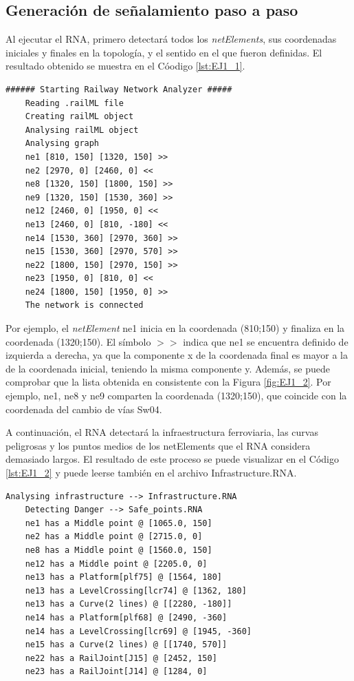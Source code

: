 \subsection{Generación de señalamiento paso a paso}

	Al ejecutar el RNA, primero detectará todos los \textit{netElements}, sus coordenadas iniciales y finales en la topología, y el sentido en el que fueron definidas. El resultado obtenido se muestra en el Cóodigo \ref{lst:EJ1_1}.
	
	\begin{lstlisting}[language = {}, caption = Detección de \textit{netElements} por parte del RNA , label = {lst:EJ1_1}]
	###### Starting Railway Network Analyzer #####
	Reading .railML file
	Creating railML object
	Analysing railML object
	Analysing graph
	ne1 [810, 150] [1320, 150] >>
	ne2 [2970, 0] [2460, 0] <<
	ne8 [1320, 150] [1800, 150] >>
	ne9 [1320, 150] [1530, 360] >>
	ne12 [2460, 0] [1950, 0] <<
	ne13 [2460, 0] [810, -180] <<
	ne14 [1530, 360] [2970, 360] >>
	ne15 [1530, 360] [2970, 570] >>
	ne22 [1800, 150] [2970, 150] >>
	ne23 [1950, 0] [810, 0] <<
	ne24 [1800, 150] [1950, 0] >>
	The network is connected
	\end{lstlisting}
	
	Por ejemplo, el \textit{netElement} ne1 inicia en la coordenada (810;150) y finaliza en la coordenada (1320;150). El símbolo $>>$ indica que ne1 se encuentra definido de izquierda a derecha, ya que la componente x de la coordenada final es mayor a la de la coordenada inicial, teniendo la misma componente y. Además, se puede comprobar que la lista obtenida en consistente con la Figura \ref{fig:EJ1_2}. Por ejemplo, ne1, ne8 y ne9 comparten la coordenada (1320;150), que coincide con la coordenada del cambio de vías Sw04.
	
	A continuación, el RNA detectará la infraestructura ferroviaria, las curvas peligrosas y los puntos medios de los netElements que el RNA considera demasiado largos. El resultado de este proceso se puede visualizar en el Código \ref{lst:EJ1_2} y puede leerse también en el archivo Infrastructure.RNA.
	
	\begin{lstlisting}[language = {}, caption = Detección de puntos críticos por parte del RNA , label = {lst:EJ1_2}]
	Analysing infrastructure --> Infrastructure.RNA
	Detecting Danger --> Safe_points.RNA
	ne1 has a Middle point @ [1065.0, 150]
	ne2 has a Middle point @ [2715.0, 0]
	ne8 has a Middle point @ [1560.0, 150]
	ne12 has a Middle point @ [2205.0, 0]
	ne13 has a Platform[plf75] @ [1564, 180]
	ne13 has a LevelCrossing[lcr74] @ [1362, 180]
	ne13 has a Curve(2 lines) @ [[2280, -180]]
	ne14 has a Platform[plf68] @ [2490, -360]
	ne14 has a LevelCrossing[lcr69] @ [1945, -360]
	ne15 has a Curve(2 lines) @ [[1740, 570]]
	ne22 has a RailJoint[J15] @ [2452, 150]
	ne23 has a RailJoint[J14] @ [1284, 0]
	\end{lstlisting}
	
